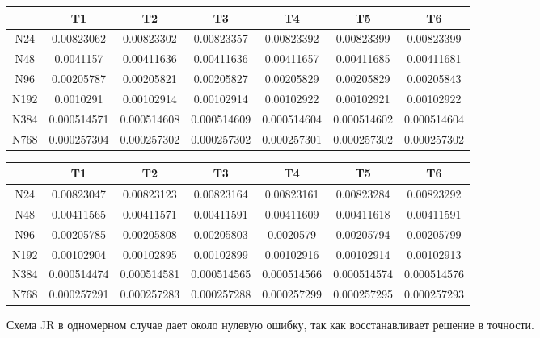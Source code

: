 \documentclass[12pt,a4paper]{article}
\begin{document}
\begin{center}
\begin{tabular}{|c|c|c|c|c|c|c|}
\hline
  & T1 & T2 & T3 & T4 & T5 & T6 \\
\hline
N24 & 0.00823062 & 0.00823302 & 0.00823357 & 0.00823392 & 0.00823399 & 0.00823399 \\
\hline
N48 & 0.0041157 & 0.00411636 & 0.00411636 & 0.00411657 & 0.00411685 & 0.00411681 \\
\hline
N96 & 0.00205787 & 0.00205821 & 0.00205827 & 0.00205829 & 0.00205829 & 0.00205843 \\
\hline
N192 & 0.0010291 & 0.00102914 & 0.00102914 & 0.00102922 & 0.00102921 & 0.00102922 \\
\hline
N384 & 0.000514571 & 0.000514608 & 0.000514609 & 0.000514604 & 0.000514602 & 0.000514604 \\
\hline
N768 & 0.000257304 & 0.000257302 & 0.000257302 & 0.000257301 & 0.000257302 & 0.000257302 \\
\hline
\end{tabular}
\label{tab:THINC_Godunov_Error}
\end{center}

\begin{center}
\begin{tabular}{|c|c|c|c|c|c|c|}
\hline
  & T1 & T2 & T3 & T4 & T5 & T6 \\
\hline
N24 & 0.00823047 & 0.00823123 & 0.00823164 & 0.00823161 & 0.00823284 & 0.00823292 \\
\hline
N48 & 0.00411565 & 0.00411571 & 0.00411591 & 0.00411609 & 0.00411618 & 0.00411591 \\
\hline
N96 & 0.00205785 & 0.00205808 & 0.00205803 & 0.0020579 & 0.00205794 & 0.00205799 \\
\hline
N192 & 0.00102904 & 0.00102895 & 0.00102899 & 0.00102916 & 0.00102914 & 0.00102913 \\
\hline
N384 & 0.000514474 & 0.000514581 & 0.000514565 & 0.000514566 & 0.000514574 & 0.000514576 \\
\hline
N768 & 0.000257291 & 0.000257283 & 0.000257288 & 0.000257299 & 0.000257295 & 0.000257293 \\
\hline
\end{tabular}
\label{tab:THINC_MUSCL_Error}
\end{center}

Схема JR в одномерном случае дает около нулевую ошибку, так как восстанавливает решение в точности.
\end{document}
